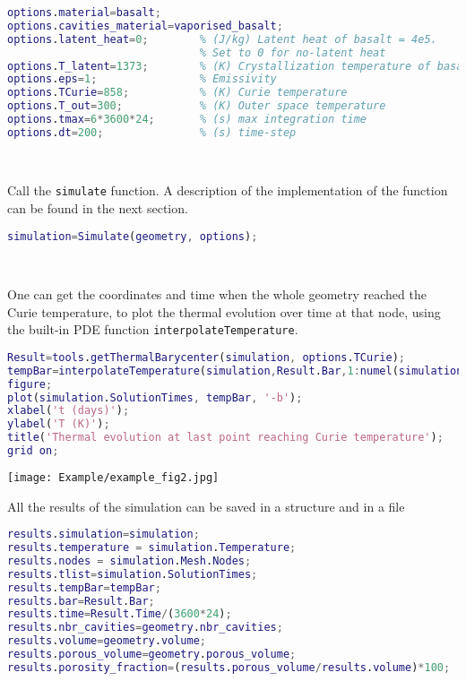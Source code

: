 \begin{lstlisting}[language=Matlab]
options.material=basalt;
options.cavities_material=vaporised_basalt;
options.latent_heat=0;        % (J/kg) Latent heat of basalt = 4e5. 
                              % Set to 0 for no-latent heat
options.T_latent=1373;        % (K) Crystallization temperature of basalt
options.eps=1;                % Emissivity
options.TCurie=858;           % (K) Curie temperature
options.T_out=300;            % (K) Outer space temperature
options.tmax=6*3600*24;       % (s) max integration time
options.dt=200;               % (s) time-step 
\end{lstlisting}
\

Call the {\tt simulate} function. A description of the implementation of the function can be found in the next section.

\begin{lstlisting}[language=Matlab]
simulation=Simulate(geometry, options);
\end{lstlisting}
\

One can get the coordinates and time when the whole geometry reached the Curie temperature, to plot the thermal evolution over time at that node, using the built-in PDE function {\tt interpolateTemperature}.

\begin{lstlisting}[language=Matlab]
Result=tools.getThermalBarycenter(simulation, options.TCurie);
tempBar=interpolateTemperature(simulation,Result.Bar,1:numel(simulation.SolutionTimes));
figure; 
plot(simulation.SolutionTimes, tempBar, '-b');
xlabel('t (days)');
ylabel('T (K)');
title('Thermal evolution at last point reaching Curie temperature');
grid on; 
\end{lstlisting}

\begin{center}
\texttt{[image: Example/example\_fig2.jpg]}
\end{center}



All the results of the simulation can be saved in a structure and in a file

\begin{lstlisting}[language=Matlab]
results.simulation=simulation;
results.temperature = simulation.Temperature;
results.nodes = simulation.Mesh.Nodes;
results.tlist=simulation.SolutionTimes;
results.tempBar=tempBar;
results.bar=Result.Bar;
results.time=Result.Time/(3600*24);
results.nbr_cavities=geometry.nbr_cavities;
results.volume=geometry.volume;
results.porous_volume=geometry.porous_volume;
results.porosity_fraction=(results.porous_volume/results.volume)*100;
\end{lstlisting}
\

